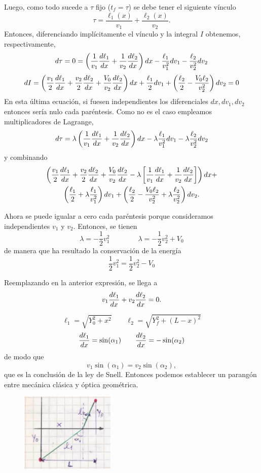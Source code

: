 \documentclass[10pt,oneside]{CBFT_book}
\begin{document}
Luego, como todo sucede a $\tau$ fijo ($t_f=\tau$) se debe tener el siguiente vínculo
\[
	\tau = \frac{\ell_1(x)}{v_1} + \frac{\ell_2(x)}{v_2}.
\]
Entonces, diferenciando implícitamente el vínculo y la integral $I$ obtenemos, respectivamente,
\[
	d\tau = 0 = \left( \frac{1}{v_1} \frac{d^{\hspace{-0.05em}} {\ell_1}}{d {x}^{\hspace{-0.05em}}} + \frac{1}{v_2} \frac{d^{\hspace{-0.05em}} {\ell_2}}{d {x}^{\hspace{-0.05em}}} \right) dx
	-\frac{\ell_1}{v_1^2} dv_1 - \frac{\ell_2}{v_2^2}dv_2
\]
\[
	dI = \left(  \frac{v_1}{2} \frac{d^{\hspace{-0.05em}} {\ell_1}}{d {x}^{\hspace{-0.05em}}} +  \frac{v_2}{2} \frac{d^{\hspace{-0.05em}} {\ell_2}}{d {x}^{\hspace{-0.05em}}} + 
	 \frac{V_0}{v_2} \frac{d^{\hspace{-0.05em}} {\ell_2}}{d {x}^{\hspace{-0.05em}}} \right) dx + 
	\frac{\ell_1}{2} dv_1 + \left( \frac{\ell_2}{2} - \frac{V_0 \ell_2}{v_2^2} \right)dv_2 = 0
\]
En esta última ecuación, si fuesen independientes los diferenciales $dx,dv_1,dv_2$ entonces sería nulo cada
paréntesis. Como no es el caso empleamos multiplicadores de Lagrange,
\[
	d\tau = \lambda \left( \frac{1}{v_1} \frac{d^{\hspace{-0.05em}} {\ell_1}}{d {x}^{\hspace{-0.05em}}} + \frac{1}{v_2} \frac{d^{\hspace{-0.05em}} {\ell_2}}{d {x}^{\hspace{-0.05em}}} \right) dx
	- \lambda \frac{\ell_1}{v_1^2} dv_1 - \lambda \frac{\ell_2}{v_2^2}dv_2
\]
y combinando
\begin{multline*}
 	\left(  \frac{v_1}{2} \frac{d^{\hspace{-0.05em}} {\ell_1}}{d {x}^{\hspace{-0.05em}}} +  \frac{v_2}{2} \frac{d^{\hspace{-0.05em}} {\ell_2}}{d {x}^{\hspace{-0.05em}}} + 
	 \frac{V_0}{v_2} \frac{d^{\hspace{-0.05em}} {\ell_2}}{d {x}^{\hspace{-0.05em}}} - \lambda \left[ \frac{1}{v_1} \frac{d^{\hspace{-0.05em}} {\ell_1}}{d {x}^{\hspace{-0.05em}}} + \frac{1}{v_2} 
	\frac{d^{\hspace{-0.05em}} {\ell_2}}{d {x}^{\hspace{-0.05em}}}  \right] \right) dx + \\
	\left( \frac{\ell_1}{2} + \lambda \frac{\ell_1}{v_1^2} \right) dv_1 + 
	\left( \frac{\ell_2}{2} - \frac{V_0 \ell_2}{v_2^2} + \lambda \frac{\ell_2}{v_2^2} \right)dv_2.
\end{multline*}

Ahora se puede igualar a cero cada paréntesis porque consideramos independientes $v_1$ y $v_2$.
Entonces, se tienen
\[
	\lambda = -\frac{1}{2}v_1^2 \qquad \qquad \lambda = -\frac{1}{2}v_2^2 + V_0
\]
de manera que ha resultado la conservación de la energía
\[
	\frac{1}{2}v_1^2 = \frac{1}{2}v_2^2 - V_0
\]

Reemplazando en la anterior expresión, se llega a
\[
	v_1 \frac{d^{\hspace{-0.05em}} {\ell_1}}{d {x}^{\hspace{-0.05em}}} + v_2 \frac{d^{\hspace{-0.05em}} {\ell_2}}{d {x}^{\hspace{-0.05em}}} = 0.
\]

\[
	\ell_1 = \sqrt{ Y_0^2 + x^2 } \qquad \ell_2 = \sqrt{ Y_f^2 + (L-x)^2 }
\]
\[
	\frac{d^{\hspace{-0.05em}} {\ell_1}}{d {x}^{\hspace{-0.05em}}} = \sin(\alpha_1) \qquad \frac{d^{\hspace{-0.05em}} {\ell_2}}{d {x}^{\hspace{-0.05em}}} = -\sin(\alpha_2)
\]
de modo que 
\[
	v_1 \sin( \alpha_1 ) = v_2 \sin( \alpha_2 ),
\]
que es la conclusión de la ley de Snell. Entonces podemos establecer un parangón entre mecánica clásica
y óptica geométrica.

\begin{figure}[htb]
	\begin{center}
	\includegraphics[width=0.4\textwidth]{images/fig_mc_snell2.pdf}	 
	\end{center}
	\caption{}
	\label{fig_mc_snell2}
\end{figure}
\end{document}
